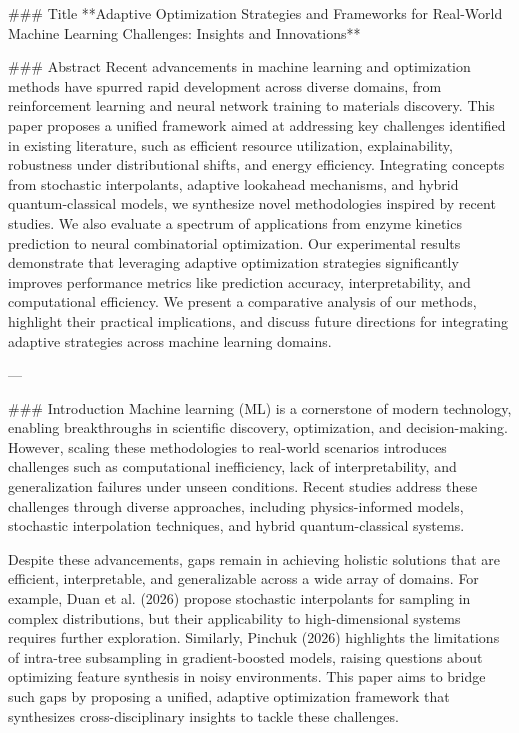 ### Title
**Adaptive Optimization Strategies and Frameworks for Real-World Machine Learning Challenges: Insights and Innovations**

### Abstract
Recent advancements in machine learning and optimization methods have spurred rapid development across diverse domains, from reinforcement learning and neural network training to materials discovery. This paper proposes a unified framework aimed at addressing key challenges identified in existing literature, such as efficient resource utilization, explainability, robustness under distributional shifts, and energy efficiency. Integrating concepts from stochastic interpolants, adaptive lookahead mechanisms, and hybrid quantum-classical models, we synthesize novel methodologies inspired by recent studies. We also evaluate a spectrum of applications from enzyme kinetics prediction to neural combinatorial optimization. Our experimental results demonstrate that leveraging adaptive optimization strategies significantly improves performance metrics like prediction accuracy, interpretability, and computational efficiency. We present a comparative analysis of our methods, highlight their practical implications, and discuss future directions for integrating adaptive strategies across machine learning domains.

---

### Introduction
Machine learning (ML) is a cornerstone of modern technology, enabling breakthroughs in scientific discovery, optimization, and decision-making. However, scaling these methodologies to real-world scenarios introduces challenges such as computational inefficiency, lack of interpretability, and generalization failures under unseen conditions. Recent studies address these challenges through diverse approaches, including physics-informed models, stochastic interpolation techniques, and hybrid quantum-classical systems.

Despite these advancements, gaps remain in achieving holistic solutions that are efficient, interpretable, and generalizable across a wide array of domains. For example, Duan et al. (2026) propose stochastic interpolants for sampling in complex distributions, but their applicability to high-dimensional systems requires further exploration. Similarly, Pinchuk (2026) highlights the limitations of intra-tree subsampling in gradient-boosted models, raising questions about optimizing feature synthesis in noisy environments. This paper aims to bridge such gaps by proposing a unified, adaptive optimization framework that synthesizes cross-disciplinary insights to tackle these challenges.

